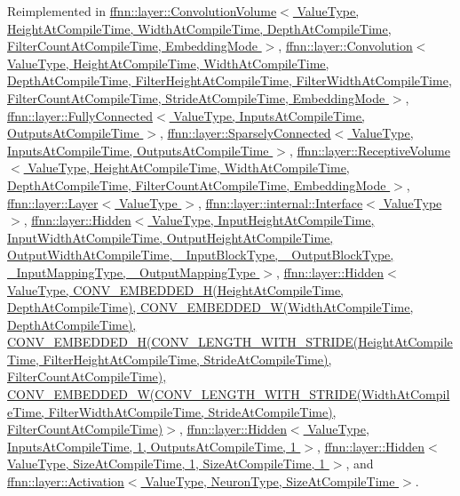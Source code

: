 Reimplemented in \hyperlink{classffnn_1_1layer_1_1_convolution_volume_a4c2d53fd8eb6c95683945ab91220bf03}{ffnn\-::layer\-::\-Convolution\-Volume$<$ Value\-Type, Height\-At\-Compile\-Time, Width\-At\-Compile\-Time, Depth\-At\-Compile\-Time, Filter\-Count\-At\-Compile\-Time, Embedding\-Mode $>$}, \hyperlink{classffnn_1_1layer_1_1_convolution_a1876a9eae2a7d48eab12279300e5adf9}{ffnn\-::layer\-::\-Convolution$<$ Value\-Type, Height\-At\-Compile\-Time, Width\-At\-Compile\-Time, Depth\-At\-Compile\-Time, Filter\-Height\-At\-Compile\-Time, Filter\-Width\-At\-Compile\-Time, Filter\-Count\-At\-Compile\-Time, Stride\-At\-Compile\-Time, Embedding\-Mode $>$}, \hyperlink{classffnn_1_1layer_1_1_fully_connected_a858f04f0752096d74e4d9876edb4c73e}{ffnn\-::layer\-::\-Fully\-Connected$<$ Value\-Type, Inputs\-At\-Compile\-Time, Outputs\-At\-Compile\-Time $>$}, \hyperlink{classffnn_1_1layer_1_1_sparsely_connected_aa8ae358e7cf06b58f3d33be2851d0260}{ffnn\-::layer\-::\-Sparsely\-Connected$<$ Value\-Type, Inputs\-At\-Compile\-Time, Outputs\-At\-Compile\-Time $>$}, \hyperlink{classffnn_1_1layer_1_1_receptive_volume_a9f813e0c5c60d572a296b8ec1fc25086}{ffnn\-::layer\-::\-Receptive\-Volume$<$ Value\-Type, Height\-At\-Compile\-Time, Width\-At\-Compile\-Time, Depth\-At\-Compile\-Time, Filter\-Count\-At\-Compile\-Time, Embedding\-Mode $>$}, \hyperlink{classffnn_1_1layer_1_1_layer_ac265fc929a178b111337226dd1cb62b6}{ffnn\-::layer\-::\-Layer$<$ Value\-Type $>$}, \hyperlink{classffnn_1_1layer_1_1internal_1_1_interface_a417d6fda112fdffed8091b0ebd78ed97}{ffnn\-::layer\-::internal\-::\-Interface$<$ Value\-Type $>$}, \hyperlink{classffnn_1_1layer_1_1_hidden_a98305185267a0f7953f1b53c4bce4cf6}{ffnn\-::layer\-::\-Hidden$<$ Value\-Type, Input\-Height\-At\-Compile\-Time, Input\-Width\-At\-Compile\-Time, Output\-Height\-At\-Compile\-Time, Output\-Width\-At\-Compile\-Time, \-\_\-\-Input\-Block\-Type, \-\_\-\-Output\-Block\-Type, \-\_\-\-Input\-Mapping\-Type, \-\_\-\-Output\-Mapping\-Type $>$}, \hyperlink{classffnn_1_1layer_1_1_hidden_a98305185267a0f7953f1b53c4bce4cf6}{ffnn\-::layer\-::\-Hidden$<$ Value\-Type, C\-O\-N\-V\-\_\-\-E\-M\-B\-E\-D\-D\-E\-D\-\_\-\-H(\-Height\-At\-Compile\-Time, Depth\-At\-Compile\-Time), C\-O\-N\-V\-\_\-\-E\-M\-B\-E\-D\-D\-E\-D\-\_\-\-W(\-Width\-At\-Compile\-Time, Depth\-At\-Compile\-Time), C\-O\-N\-V\-\_\-\-E\-M\-B\-E\-D\-D\-E\-D\-\_\-\-H(\-C\-O\-N\-V\-\_\-\-L\-E\-N\-G\-T\-H\-\_\-\-W\-I\-T\-H\-\_\-\-S\-T\-R\-I\-D\-E(\-Height\-At\-Compile\-Time, Filter\-Height\-At\-Compile\-Time, Stride\-At\-Compile\-Time), Filter\-Count\-At\-Compile\-Time), C\-O\-N\-V\-\_\-\-E\-M\-B\-E\-D\-D\-E\-D\-\_\-\-W(\-C\-O\-N\-V\-\_\-\-L\-E\-N\-G\-T\-H\-\_\-\-W\-I\-T\-H\-\_\-\-S\-T\-R\-I\-D\-E(\-Width\-At\-Compile\-Time, Filter\-Width\-At\-Compile\-Time, Stride\-At\-Compile\-Time), Filter\-Count\-At\-Compile\-Time)$>$}, \hyperlink{classffnn_1_1layer_1_1_hidden_a98305185267a0f7953f1b53c4bce4cf6}{ffnn\-::layer\-::\-Hidden$<$ Value\-Type, Inputs\-At\-Compile\-Time, 1, Outputs\-At\-Compile\-Time, 1 $>$}, \hyperlink{classffnn_1_1layer_1_1_hidden_a98305185267a0f7953f1b53c4bce4cf6}{ffnn\-::layer\-::\-Hidden$<$ Value\-Type, Size\-At\-Compile\-Time, 1, Size\-At\-Compile\-Time, 1 $>$}, and \hyperlink{classffnn_1_1layer_1_1_activation_ab5525e49c08fc593856b9c95e0eba1ee}{ffnn\-::layer\-::\-Activation$<$ Value\-Type, Neuron\-Type, Size\-At\-Compile\-Time $>$}.
